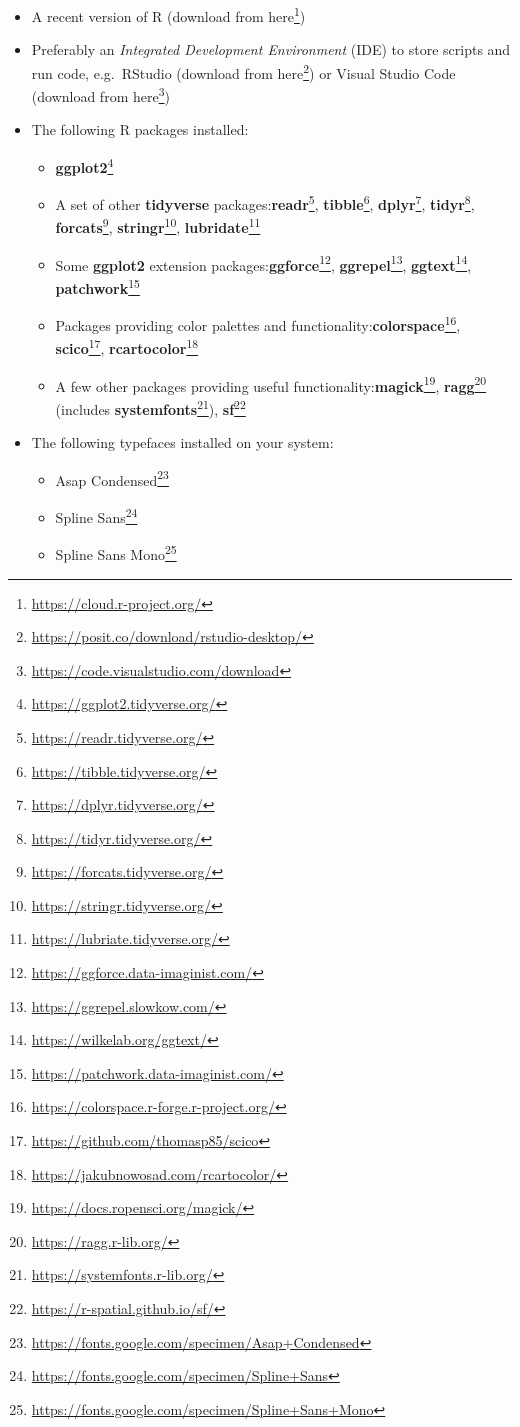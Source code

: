 \documentclass[
]{krantz}
\providecommand{\tightlist}{%
  \setlength{\itemsep}{0pt}\setlength{\parskip}{0pt}}
\renewcommand{\href}[2]{#2\footnote{\url{#1}}}
\begin{document}
\begin{itemize}
\tightlist
\item
  A recent version of R (download from \href{https://cloud.r-project.org/}{here})
\item
  Preferably an \emph{Integrated Development Environment} (IDE) to store scripts and run code, e.g.~RStudio (download from \href{https://posit.co/download/rstudio-desktop/}{here}) or Visual Studio Code (download from \href{https://code.visualstudio.com/download}{here})
\item
  The following R packages installed:

  \begin{itemize}
  \tightlist
  \item
    \href{https://ggplot2.tidyverse.org/}{\textbf{ggplot2}}
  \item
    A set of other \textbf{tidyverse} packages:\href{https://readr.tidyverse.org/}{\textbf{readr}}, \href{https://tibble.tidyverse.org/}{\textbf{tibble}}, \href{https://dplyr.tidyverse.org/}{\textbf{dplyr}}, \href{https://tidyr.tidyverse.org/}{\textbf{tidyr}}, \href{https://forcats.tidyverse.org/}{\textbf{forcats}}, \href{https://stringr.tidyverse.org/}{\textbf{stringr}}, \href{https://lubriate.tidyverse.org/}{\textbf{lubridate}}
  \item
    Some \textbf{ggplot2} extension packages:\href{https://ggforce.data-imaginist.com/}{\textbf{ggforce}}, \href{https://ggrepel.slowkow.com/}{\textbf{ggrepel}}, \href{https://wilkelab.org/ggtext/}{\textbf{ggtext}}, \href{https://patchwork.data-imaginist.com/}{\textbf{patchwork}}
  \item
    Packages providing color palettes and functionality:\href{https://colorspace.r-forge.r-project.org/}{\textbf{colorspace}}, \href{https://github.com/thomasp85/scico}{\textbf{scico}}, \href{https://jakubnowosad.com/rcartocolor/}{\textbf{rcartocolor}}
  \item
    A few other packages providing useful functionality:\href{https://docs.ropensci.org/magick/}{\textbf{magick}}, \href{https://ragg.r-lib.org/}{\textbf{ragg}} (includes \href{https://systemfonts.r-lib.org/}{\textbf{systemfonts}}), \href{https://r-spatial.github.io/sf/}{\textbf{sf}}
  \end{itemize}
\item
  The following typefaces installed on your system:

  \begin{itemize}
  \tightlist
  \item
    \href{https://fonts.google.com/specimen/Asap+Condensed}{Asap Condensed}
  \item
    \href{https://fonts.google.com/specimen/Spline+Sans}{Spline Sans}
  \item
    \href{https://fonts.google.com/specimen/Spline+Sans+Mono}{Spline Sans Mono}
  \end{itemize}
\end{itemize}
\end{document}
